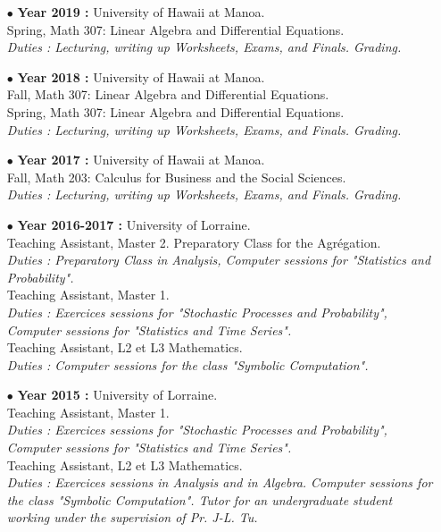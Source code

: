 \documentclass[a4paper,11pt]{article}
\begin{document}
\begin{itemize}

\item[$\bullet$] \textbf{ Year 2019 :} University of Hawaii at Manoa.\\
					Spring, Math 307: Linear Algebra and Differential Equations.\\
					\textit{Duties : Lecturing, writing up Worksheets, Exams, and Finals. Grading.}\\

\item[$\bullet$] \textbf{ Year 2018 :} University of Hawaii at Manoa.\\
					Fall, Math 307: Linear Algebra and Differential Equations.\\
					Spring, Math 307: Linear Algebra and Differential Equations.\\
					\textit{Duties : Lecturing, writing up Worksheets, Exams, and Finals. Grading.}\\

\item[$\bullet$] \textbf{ Year 2017 :} University of Hawaii at Manoa.\\
					Fall, Math 203: Calculus for Business and the Social Sciences.\\
					\textit{Duties : Lecturing, writing up Worksheets, Exams, and Finals. Grading.}\\

\item[$\bullet$] \textbf{ Year 2016-2017 :} University of Lorraine.\\
					Teaching Assistant, Master 2. Preparatory Class for the Agrégation.\\
					\textit{Duties : Preparatory Class in Analysis, Computer sessions for "Statistics and Probability".}\\
					Teaching Assistant, Master 1.\\
					\textit{Duties : Exercices sessions for "Stochastic Processes and Probability", Computer sessions for "Statistics and Time Series".}\\
					Teaching Assistant, L2 et L3 Mathematics. \\
					\textit{Duties : Computer sessions for the class "Symbolic Computation".}\\   
\item[$\bullet$] \textbf{ Year 2015 :} University of Lorraine.\\
					Teaching Assistant, Master 1.\\
					\textit{Duties : Exercices sessions for "Stochastic Processes and Probability", Computer sessions for "Statistics and Time Series".}\\
					Teaching Assistant, L2 et L3 Mathematics. \\
					\textit{Duties : Exercices sessions in Analysis and in Algebra. Computer sessions for the class "Symbolic Computation". Tutor for an undergraduate student working under the supervision of Pr. J-L. Tu.}\\   
					

\end{itemize}
\end{document}
